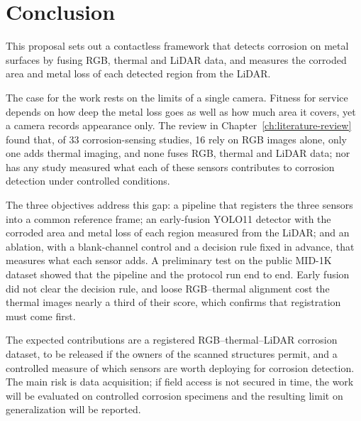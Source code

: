 \chapter[CONCLUSION]{Conclusion}
\label{ch:conclusion}

This proposal sets out a contactless framework that detects corrosion on metal
surfaces by fusing RGB, thermal and LiDAR data, and measures the corroded area
and metal loss of each detected region from the LiDAR.

The case for the work rests on the limits of a single camera. Fitness for
service depends on how deep the metal loss goes as well as how much area it
covers, yet a camera records appearance only. The review in
Chapter~\ref{ch:literature-review} found that, of 33 corrosion-sensing studies,
16 rely on RGB images alone, only one adds thermal imaging, and none fuses RGB,
thermal and LiDAR data; nor has any study measured what each of these sensors
contributes to corrosion detection under controlled conditions.

The three objectives address this gap: a pipeline that registers the three
sensors into a common reference frame; an early-fusion YOLO11 detector with the
corroded area and metal loss of each region measured from the LiDAR; and an
ablation, with a blank-channel control and a decision rule fixed in advance,
that measures what each sensor adds. A preliminary test on the public MID-1K
dataset showed that the pipeline and the protocol run end to end. Early fusion
did not clear the decision rule, and loose RGB--thermal alignment cost the
thermal images nearly a third of their score, which confirms that registration
must come first.

The expected contributions are a registered RGB--thermal--LiDAR corrosion
dataset, to be released if the owners of the scanned structures permit, and a
controlled measure of which sensors are worth deploying for corrosion detection.
The main risk is data acquisition; if field access is not secured in time, the
work will be evaluated on controlled corrosion specimens and the resulting limit
on generalization will be reported.
